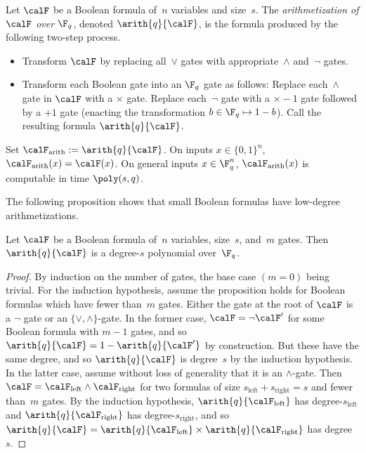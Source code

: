 \begin{definition}[Arithmetization]\label{def:arithmetization}
Let $\calF$ be a Boolean formula of~$n$ variables and size~$s$.
The \emph{arithmetization of $\calF$ over $\F_q$}, denoted $\arith{q}{\calF}$, is the formula produced by the following two-step process.
\begin{itemize}
\item[(i)] Transform $\calF$ by replacing all~$\lor$ gates with appropriate~$\land$ and~$\neg$ gates.
\item[(ii)] Transform each Boolean gate into an $\F_q$ gate as follows:
		Replace each~$\land$ gate in $\calF$ with a $\times$ gate.
		Replace each~$\neg$ gate with a $\times -1$ gate followed by a $+1$ gate (enacting the transformation $b \in \F_q \mapsto 1-b$).
		Call the resulting formula $\arith{q}{\calF}$.
\end{itemize}
Set $\calF_{\mathrm{arith}} := \arith{q}{\calF}$.
On inputs $x \in \{0, 1\}^n$, $\calF_{\mathrm{arith}}(x) = \calF(x)$.
On general inputs $x \in \F_q^n$, $\calF_{\mathrm{arith}}(x)$ is computable in time $\poly(s, q)$.
\end{definition}

The following proposition shows that small Boolean formulas have low-degree arithmetizations.

\begin{proposition}\label{prop:low-degree-arithmetization}
Let $\calF$ be a Boolean formula of~$n$ variables, size~$s$, and~$m$ gates.
Then $\arith{q}{\calF}$ is a degree-$s$ polynomial over~$\F_q$.
\end{proposition}
\begin{proof}
By induction on the number of gates, the base case $(m = 0)$ being trivial.
For the induction hypothesis, assume the proposition holds for Boolean formulas which have fewer than~$m$ gates.
Either the gate at the root of $\calF$ is a $\neg$ gate or an $\{\lor, \land\}$-gate.
In the former case, $\calF = \neg \calF'$ for some Boolean formula with $m-1$ gates,
and so $\arith{q}{\calF} = 1 - \arith{q}{\calF'}$ by construction.
But these have the same degree, and so $\arith{q}{\calF}$ is degree~$s$ by the induction hypothesis.
In the latter case, assume without loss of generality that it is an $\land$-gate. 
Then $\calF= \calF_{\mathrm{left}} \land \calF_{\mathrm{right}}$ for two formulas
of size $s_{\mathrm{left}} + s_{\mathrm{right}} = s$ and fewer than~$m$ gates.
By the induction hypothesis, $\arith{q}{\calF_{\mathrm{left}}}$ has degree-$s_{\mathrm{left}}$ and
$\arith{q}{\calF_{\mathrm{right}}}$ has degree-$s_{\mathrm{right}}$,
and so $\arith{q}{\calF} = \arith{q}{\calF_{\mathrm{left}}} \times \arith{q}{\calF_{\mathrm{right}}}$ has degree~$s$.
\end{proof}

